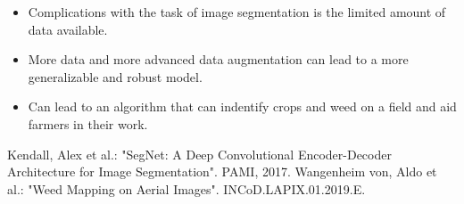 \documentclass[
    ,title     = {{Image Segmentation for Smart Agriculture}}
    ,subject   = {{This is the subject of my work}}
    ,papersize = {{a1paper}}
    ,nocrop
]{dtuposter}
\begin{document}
\begin{dtupostercontent}
\begin{itemize}
	\item Complications with the task of image segmentation is the limited amount of data available. 
	\item More data and more advanced data augmentation can lead to a more generalizable and robust model.
	\item Can lead to an algorithm that can indentify crops and weed on a field and aid farmers in their work. 
\end{itemize}

\begin{thebibliography}{9}
	 Kendall, Alex et al.: "SegNet: A Deep Convolutional Encoder-Decoder Architecture for Image Segmentation". PAMI, 2017.
	 Wangenheim von, Aldo et al.: "Weed Mapping on Aerial Images". INCoD.LAPIX.01.2019.E.
\end{thebibliography}
\end{dtupostercontent}
\end{document}
